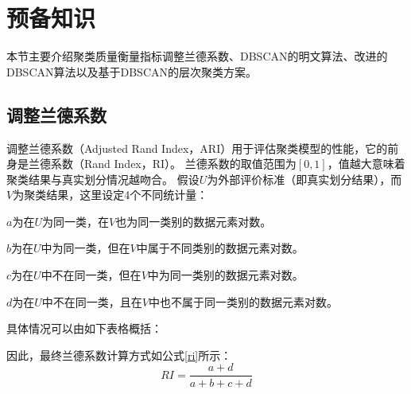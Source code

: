 \section{预备知识}
\label{s4-yubei}
本节主要介绍聚类质量衡量指标调整兰德系数、DBSCAN的明文算法、改进的DBSCAN算法以及基于DBSCAN的层次聚类方案。

\subsection{调整兰德系数}
\label{s4-ari-intro}
调整兰德系数（Adjusted Rand Index，ARI）\cite{hubert1985comparing}用于评估聚类模型的性能，它的前身是兰德系数（Rand Index，RI）。
兰德系数的取值范围为$ [0,1] $，值越大意味着聚类结果与真实划分情况越吻合。
假设$ U $为外部评价标准（即真实划分结果），而$ V $为聚类结果，这里设定4个不同统计量：
\begin{compactitem}
	\item $ a $为在$ U $为同一类，在$ V $也为同一类别的数据元素对数。
	\item $ b $为在$ U $中为同一类，但在$ V $中属于不同类别的数据元素对数。
	\item $ c $为在$ U $中不在同一类，但在$ V $中为同一类别的数据元素对数。
	\item $ d $为在$ U $中不在同一类，且在$ V $中也不属于同一类别的数据元素对数。
\end{compactitem}

具体情况可以由如下表格概括：

\begin{table}[htbp]
	\centering
	\renewcommand{\arraystretch}{1.3}
	\caption{RI指标计算参数解释}
	\label{s4-table-dataset}
\end{table}

因此，最终兰德系数计算方式如公式\ref{ri}所示：
\begin{equation}
	R I=\frac{a+d}{a+b+c+d}
	\label{ri}
\end{equation}

